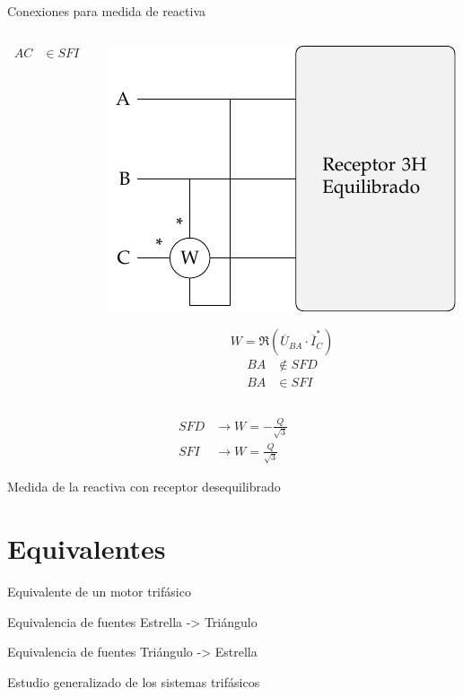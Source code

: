 \documentclass[aspectratio=169, usenames,svgnames,dvipsnames]{beamer}
\begin{document}
\begin{frame}[label={sec:org3a2c079}]{Conexiones para medida de reactiva}
\begin{columns}
\begin{column}{0.33\columnwidth}
\begin{align*}
  AC &\in SFI
\end{align*}
\end{column}
\begin{column}{0.33\columnwidth}
\begin{center}
\includegraphics[height=0.25\textheight]{../figs/Reactiva3H_C-BA.pdf}
\end{center}
\[
  W = \Re(\overline{U}_{BA} \cdot \overline{I}_C^*)
\]
\begin{align*}
  BA &\notin SFD\\
  BA &\in SFI
\end{align*}
\end{column}
\end{columns}
\begin{align*}
SFD &\rightarrow \boxed{W = - \frac{Q}{\sqrt{3}}}\\
SFI &\rightarrow \boxed{W = \frac{Q}{\sqrt{3}}}
\end{align*}
\end{frame}

\begin{frame}[label={sec:org32a3466}]{Medida de la reactiva con receptor desequilibrado}
\end{frame}


\section{Equivalentes}
\label{sec:org57bdb4f}

\begin{frame}[label={sec:orgb4ce00e}]{Equivalente de un motor trifásico}
\end{frame}

\begin{frame}[label={sec:orga2e0f89}]{Equivalencia de fuentes}
Estrella -> Triángulo
\end{frame}
\begin{frame}[label={sec:orgc7de8f0}]{Equivalencia de fuentes}
Triángulo -> Estrella
\end{frame}
\begin{frame}[label={sec:orgec9ebf9}]{Estudio generalizado de los sistemas trifásicos}
\end{frame}
\end{document}
